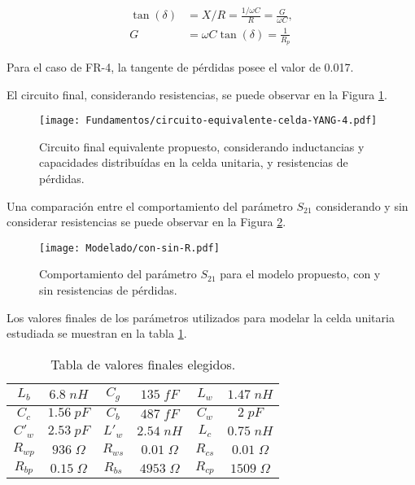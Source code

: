 \begin{align}
	\tan(\delta) &= X/R = \frac{1/\omega C}{R} = \frac{G}{\omega C}, \\
	G &= \omega C \tan(\delta) = \frac{1}{R_p}
\end{align}

Para el caso de FR-4, la tangente de pérdidas posee el valor de 0.017.

El circuito final, considerando resistencias, se puede observar en la Figura \ref{fig:modelo-circuital-todojunto-conR}.

\begin{figure}[h]
	\centering
	\texttt{[image: Fundamentos/circuito-equivalente-celda-YANG-4.pdf]}
	\caption{Circuito final equivalente propuesto, considerando inductancias y capacidades distribuídas en la celda unitaria, y resistencias de pérdidas.}
	\label{fig:modelo-circuital-todojunto-conR}
\end{figure}

Una comparación entre el comportamiento del parámetro $S_{21}$ considerando y sin considerar resistencias se puede observar en la Figura \ref{fig:con-sin-R}.

\begin{figure}[h]
	\centering
	\texttt{[image: Modelado/con-sin-R.pdf]}
	\caption{Comportamiento del parámetro $S_{21}$ para el modelo propuesto, con y sin resistencias de pérdidas.}
	\label{fig:con-sin-R}
\end{figure}

Los valores finales de los parámetros utilizados para modelar la celda unitaria estudiada se muestran en la tabla \ref{table:valoresFinalesModelo}.

\begin{table}
	\centering
	\begin{tabular}{| c c | c c | c c |}
		\hline 
		$L_b$ & $6.8\; nH$ & $C_g$ & $135\; fF$ & $L_w$ & $1.47\; nH$ \\
		\hline
		$C_c$ & $1.56\; pF$ & $C_b$ & $487 \;fF$ & $C_w$ & $2 \; pF$\\
		\hline
		$C'_w$ & $2.53\; pF$ & $L'_w$ & $2.54\; nH$ & $L_c$ & $0.75\; nH$\\
		\hline
		$R_{wp}$ & $936\; \Omega$ & $R_{ws}$ & $0.01\; \Omega$ & $R_{cs}$ & $0.01\; \Omega$\\
		\hline
		$R_{bp}$ & $0.15\; \Omega$ & $R_{bs}$ & $4953\; \Omega$ & $R_{cp}$ & $1509\; \Omega$\textbf{}\\
		\hline
	\end{tabular}
	\caption{Tabla de valores finales elegidos.}
	\label{table:valoresFinalesModelo}
\end{table}

